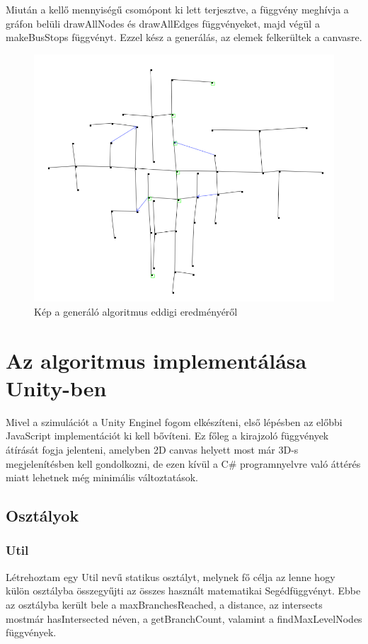 Miután a kellő mennyiségű csomópont ki lett terjesztve, a függvény meghívja a gráfon belüli drawAllNodes és drawAllEdges függvényeket, majd végül a makeBusStops függvényt. Ezzel kész a generálás, az elemek felkerültek a canvasre.
\begin{figure}[H]
\includegraphics[width=\linewidth]{graph.png}
\caption{Kép a generáló algoritmus eddigi eredményéről}
\label{fig:graph}
\end{figure}
\section{Az algoritmus implementálása Unity-ben}
Mivel a szimulációt a Unity Enginel fogom elkészíteni, első lépésben az előbbi JavaScript implementációt ki kell bővíteni. Ez főleg a kirajzoló függvények átírását fogja jelenteni, amelyben 2D canvas helyett most már 3D-s megjelenítésben kell gondolkozni, de ezen kívül a C\# programnyelvre való áttérés miatt lehetnek még minimális változtatások.
\subsection{Osztályok}
\subsubsection{Util}
Létrehoztam egy Util nevű statikus osztályt, melynek fő célja az lenne hogy külön osztályba összegyűjti az összes használt matematikai Segédfüggvényt. Ebbe az osztályba került bele a maxBranchesReached, a distance, az intersects mostmár hasIntersected néven, a getBranchCount, valamint a findMaxLevelNodes függvények. 

